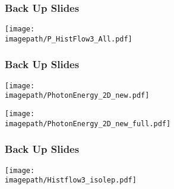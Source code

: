 
\begin{frame}\frametitle{Back Up Slides }

    \centering
    \texttt{[image: \\imagepath/P\_HistFlow3\_All.pdf]}

\end{frame}


\begin{frame}\frametitle{Back Up Slides }

    \begin{minipage}{0.49\textwidth}
        \centering
        \texttt{[image: \\imagepath/PhotonEnergy\_2D\_new.pdf]}
    \end{minipage}\hfill
    \begin{minipage}{0.49\textwidth}
        \centering
        \texttt{[image: \\imagepath/PhotonEnergy\_2D\_new\_full.pdf]}
    \end{minipage}

\end{frame}


\begin{frame}\frametitle{Back Up Slides }

    \centering
    \texttt{[image: \\imagepath/Histflow3\_isolep.pdf]}

    \end{frame}




